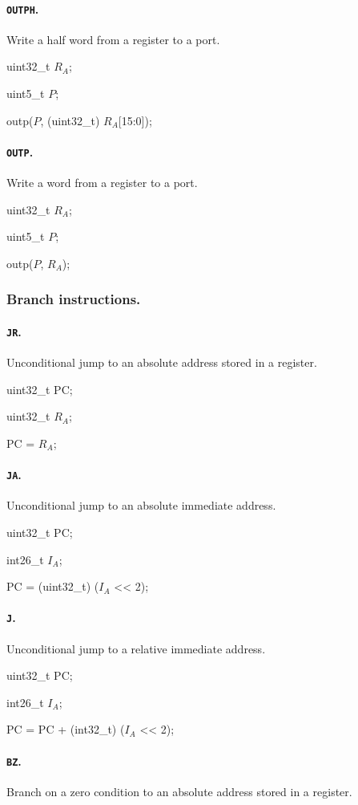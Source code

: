 \documentclass[12pt,english,twoside]{report}
\def\code{\texttt}
\def\subsubsubsection{\paragraph}
\newenvironment{codeblock}
{\begin{list}{}{
\setlength{\rightmargin}{\leftmargin}
\setlength{\listparindent}{0pt}%
\raggedright
\setlength{\itemsep}{0pt}
\setlength{\parsep}{0pt}
\normalfont\ttfamily}%
 \item[]}
{\end{list}}
\begin{document}
\subsubsubsection{\label{sec:Ins_OUTPH}\code{OUTPH}.}
Write a half word from a register to a port.

\begin{codeblock}
  uint32\_t $R_A$;

  uint5\_t $P$;

  outp($P$, (uint32\_t) $R_A$[15:0]);
\end{codeblock}

\subsubsubsection{\label{sec:Ins_OUTP}\code{OUTP}.}
Write a word from a register to a port.

\begin{codeblock}
  uint32\_t $R_A$;

  uint5\_t $P$;

  outp($P$, $R_A$);
\end{codeblock}


\subsubsection{Branch instructions.}

\subsubsubsection{\label{sec:Ins_JR}\code{JR}.}
Unconditional jump to an absolute address stored in a register.

\begin{codeblock}
  uint32\_t PC;

  uint32\_t $R_A$;

  PC = $R_A$;
\end{codeblock}

\subsubsubsection{\label{sec:Ins_JA}\code{JA}.}
Unconditional jump to an absolute immediate address.

\begin{codeblock}
  uint32\_t PC;

  int26\_t $I_A$;

  PC = (uint32\_t) ($I_A$ <{}< 2);
\end{codeblock}

\subsubsubsection{\label{sec:Ins_J}\code{J}.}
Unconditional jump to a relative immediate address.

\begin{codeblock}
  uint32\_t PC;

  int26\_t $I_A$;

  PC = PC + (int32\_t) ($I_A$ <{}< 2);
\end{codeblock}
  
\subsubsubsection{\label{sec:Ins_BZ}\code{BZ}.}
Branch on a zero condition to an absolute address stored in a register.
\end{document}
